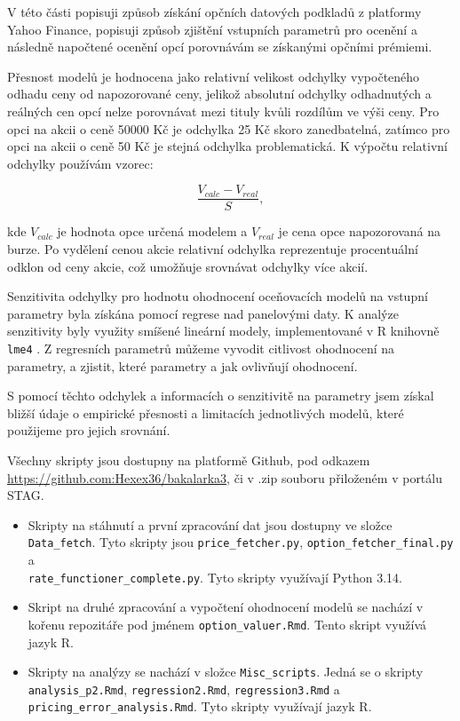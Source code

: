 \documentclass[male,czech,api_bc]{kitheses}
\begin{document}
  V této části popisuji způsob získání opčních datových podkladů z platformy Yahoo Finance, popisuji způsob zjištění vstupních parametrů pro ocenění a následně napočtené ocenění opcí porovnávám se získanými opčními prémiemi.

  Přesnost modelů je hodnocena jako relativní velikost odchylky vypočteného odhadu ceny od napozorované ceny, jelikož absolutní odchylky odhadnutých a reálných cen opcí nelze porovnávat mezi tituly kvůli rozdílům ve výši ceny. Pro opci na akcii o ceně 50000 Kč je odchylka 25 Kč skoro zanedbatelná, zatímco pro opci na akcii o ceně 50 Kč je stejná odchylka problematická.
  K výpočtu relativní odchylky používám vzorec:

  \begin{equation}
    \frac{V_{calc} - V_{real}}{S},
  \end{equation}

  kde $V_{calc}$ je hodnota opce určená modelem a $V_{real}$ je cena opce napozorovaná na burze. Po vydělení cenou akcie relativní odchylka reprezentuje procentuální odklon od ceny akcie, což umožňuje srovnávat odchylky více akcií.

  Senzitivita odchylky pro hodnotu ohodnocení oceňovacích modelů na vstupní parametry byla získána pomocí regrese nad panelovými daty. K analýze senzitivity byly využity smíšené lineární modely, implementované v R knihovně \texttt{lme4} \parencites{LME4}. Z regresních parametrů můžeme vyvodit citlivost ohodnocení na parametry, a zjistit, které parametry a jak ovlivňují ohodnocení.

  S pomocí těchto odchylek a informacích o senzitivitě na parametry jsem získal bližší údaje o empirické přesnosti a limitacích jednotlivých modelů, které použijeme pro jejich srovnání. 

  Všechny skripty jsou dostupny na platformě Github, pod odkazem \url{https://github.com:Hexex36/bakalarka3}, či v .zip souboru přiloženém v portálu STAG. 

  \begin{itemize}
    \item Skripty na stáhnutí a první zpracování dat jsou dostupny ve složce \texttt{Data\_fetch}. Tyto skripty jsou \texttt{price\_fetcher.py}, \texttt{option\_fetcher\_final.py} a \\ \texttt{rate\_functioner\_complete.py}. Tyto skripty využívají Python 3.14.
    \item Skript na druhé zpracování a vypočtení ohodnocení modelů se nachází v kořenu repozitáře pod jménem \texttt{option\_valuer.Rmd}. Tento skript využívá jazyk R.
    \item Skripty na analýzy se nachází v složce \texttt{Misc\_scripts}. Jedná se o skripty \texttt{analysis\_p2.Rmd}, \texttt{regression2.Rmd}, \texttt{regression3.Rmd} a \texttt{pricing\_error\_analysis.Rmd}. Tyto skripty využívají jazyk R. 
  \end{itemize}
\end{document}
